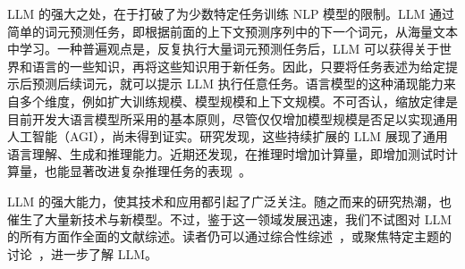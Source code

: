 LLM 的强大之处，在于打破了为少数特定任务训练 NLP 模型的限制。LLM 通过简单的词元预测任务，即根据前面的上下文预测序列中的下一个词元，从海量文本中学习。一种普遍观点是，反复执行大量词元预测任务后，LLM 可以获得关于世界和语言的一些知识，再将这些知识用于新任务。因此，只要将任务表述为给定提示后预测后续词元，就可以提示 LLM 执行任意任务。语言模型的这种涌现能力来自多个维度，例如扩大训练规模、模型规模和上下文规模。不可否认，缩放定律是目前开发大语言模型所采用的基本原则，尽管仅仅增加模型规模是否足以实现通用人工智能（AGI），尚未得到证实。研究发现，这些持续扩展的 LLM 展现了通用语言理解、生成和推理能力。近期还发现，在推理时增加计算量，即增加测试时计算量，也能显著改进复杂推理任务的表现~\cite{openai:2024learning}。

LLM 的强大能力，使其技术和应用都引起了广泛关注。随之而来的研究热潮，也催生了大量新技术与新模型。不过，鉴于这一领域发展迅速，我们不试图对 LLM 的所有方面作全面的文献综述。读者仍可以通过综合性综述~\cite{zhao-etal:2023survey,minaee-etal:2024large}，或聚焦特定主题的讨论~\cite{ruan-etal:2024abigsurveyofllms}，进一步了解 LLM。

